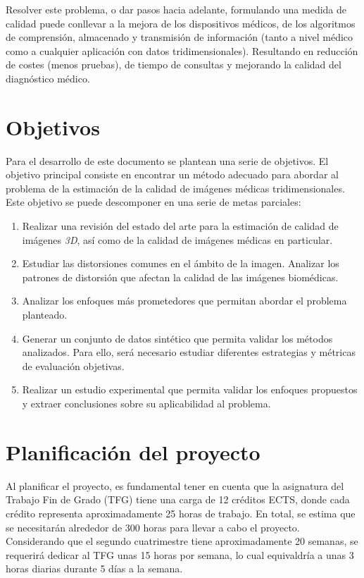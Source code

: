 Resolver este problema, o dar pasos hacia adelante, formulando una medida de calidad
puede conllevar a la mejora de los dispositivos médicos, de los algoritmos de comprensión, almacenado 
y transmisión de información (tanto a nivel médico como a cualquier 
aplicación con datos tridimensionales).
Resultando en reducción de costes (menos pruebas), de tiempo de consultas y 
mejorando la calidad del diagnóstico médico. 

\section{Objetivos}
Para el desarrollo de este documento se plantean una serie de objetivos. 
El objetivo principal consiste en encontrar un método adecuado para abordar al 
problema de la estimación de la calidad de imágenes médicas tridimensionales. 
Este objetivo se puede descomponer en una serie de metas parciales: 
\begin{enumerate}
  \item Realizar una revisión del estado del arte para la estimación de calidad 
    de imágenes \emph{3D}, así como de la calidad de imágenes médicas en particular.
  \item Estudiar las distorsiones comunes en el ámbito de la imagen. 
    Analizar los patrones de distorsión que afectan la calidad de las imágenes 
    biomédicas.
  \item Analizar los enfoques más prometedores que permitan abordar el problema planteado. 
  \item Generar un conjunto de datos sintético que permita validar 
    los métodos analizados. Para ello, será necesario estudiar diferentes 
    estrategias y métricas de evaluación objetivas\cite{ITU-R.2012, ITU-r.2021, DatasetGeneration}.
  \item Realizar un estudio experimental que permita validar los enfoques 
    propuestos y extraer conclusiones sobre su aplicabilidad al problema. 
\end{enumerate}
\section{Planificación del proyecto}
Al planificar el proyecto, es fundamental tener en cuenta que la asignatura del 
Trabajo Fin de Grado (TFG) tiene una carga de 12 créditos ECTS, donde cada 
crédito representa aproximadamente 25 horas de trabajo. 
En total, se estima que se necesitarán alrededor de 300 horas para llevar a cabo 
el proyecto. Considerando que el segundo cuatrimestre tiene aproximadamente 20 semanas, 
se requerirá dedicar al TFG unas 15 horas por semana, lo cual equivaldría a unas 3 horas 
diarias durante 5 días a la semana.
 
